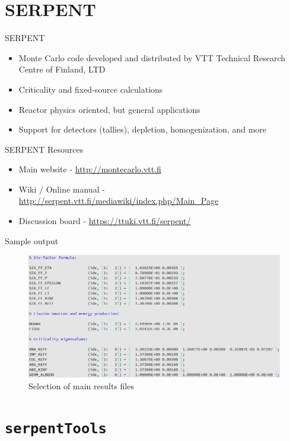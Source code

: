 \documentclass{beamer}
\newcommand{\st}{\texttt{serpentTools} }
\begin{document}
\section{SERPENT}
\begin{frame}{SERPENT}
    \begin{itemize}
        \item Monte Carlo code developed and distributed by VTT Technical Research Centre of Finland, LTD
        \item Criticality and fixed-source calculations
        \item Reactor physics oriented, but general applications
        \item Support for detectors (tallies), depletion, homogenization, and more
    \end{itemize}
\end{frame}

\begin{frame}{SERPENT Resources}
    \begin{itemize}
        \item{Main website - \url{http://montecarlo.vtt.fi}}
        \item{Wiki / Online manual - \url{http://serpent.vtt.fi/mediawiki/index.php/Main_Page}}
        \item{Discussion board - \url{https://ttuki.vtt.fi/serpent/}}
    \end{itemize}
\end{frame}

\begin{frame}{Sample output}
    \begin{figure}
        \centering
        \includegraphics[width=\linewidth]{./images/res.png}
        \caption{Selection of main results files}
    \end{figure}
\end{frame}

\section{\st}
\end{document}
